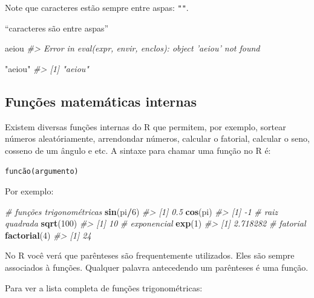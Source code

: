 \documentclass[]{book}
\newenvironment{Shaded}{\begin{snugshade}}{\end{snugshade}}
\newcommand{\KeywordTok}[1]{\textcolor[rgb]{0.13,0.29,0.53}{\textbf{#1}}}
\newcommand{\DecValTok}[1]{\textcolor[rgb]{0.00,0.00,0.81}{#1}}
\newcommand{\StringTok}[1]{\textcolor[rgb]{0.31,0.60,0.02}{#1}}
\newcommand{\CommentTok}[1]{\textcolor[rgb]{0.56,0.35,0.01}{\textit{#1}}}
\newcommand{\OperatorTok}[1]{\textcolor[rgb]{0.81,0.36,0.00}{\textbf{#1}}}
\newcommand{\NormalTok}[1]{#1}
\begin{document}
Note que caracteres estão sempre entre aspas: \texttt{""}.

``caracteres são entre aspas''

\begin{Shaded}
\begin{Highlighting}[]
\NormalTok{aeiou}
\CommentTok{#> Error in eval(expr, envir, enclos): object 'aeiou' not found}
\end{Highlighting}
\end{Shaded}

\begin{Shaded}
\begin{Highlighting}[]
\StringTok{"aeiou"}
\CommentTok{#> [1] "aeiou"}
\end{Highlighting}
\end{Shaded}

\subsection{Funções matemáticas
internas}\label{funcoes-matematicas-internas}

Existem diversas funções internas do R que permitem, por exemplo,
sortear números aleatóriamente, arrendondar números, calcular o
fatorial, calcular o seno, cosseno de um ângulo e etc. A sintaxe para
chamar uma função no R é:

\texttt{funcão(argumento)}

Por exemplo:

\begin{Shaded}
\begin{Highlighting}[]
\CommentTok{# funções trigonométricas}
\KeywordTok{sin}\NormalTok{(pi}\OperatorTok{/}\DecValTok{6}\NormalTok{)}
\CommentTok{#> [1] 0.5}
\KeywordTok{cos}\NormalTok{(pi)}
\CommentTok{#> [1] -1}
\CommentTok{# raiz quadrada}
\KeywordTok{sqrt}\NormalTok{(}\DecValTok{100}\NormalTok{)}
\CommentTok{#> [1] 10}
\CommentTok{# exponencial}
\KeywordTok{exp}\NormalTok{(}\DecValTok{1}\NormalTok{)}
\CommentTok{#> [1] 2.718282}
\CommentTok{# fatorial}
\KeywordTok{factorial}\NormalTok{(}\DecValTok{4}\NormalTok{)}
\CommentTok{#> [1] 24}
\end{Highlighting}
\end{Shaded}

No R você verá que parênteses são frequentemente utilizados. Eles são
sempre associados à funções. Qualquer palavra antecedendo um parênteses
é uma função.

Para ver a lista completa de funções trigonométricas:
\end{document}
